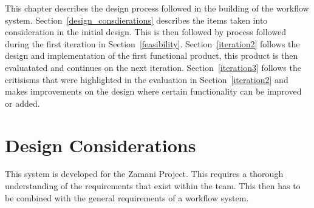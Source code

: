 \documentclass[12pt,a4paper]{report}
\begin{document}
\noindent This chapter describes the design process followed in the building
of the workflow system. Section~\ref{design_consdierations} describes
the items taken into consideration in the initial design. This is then
followed by process followed during the first iteration in Section~\ref{feasibility}.
Section~\ref{iteration2} follows the design and implementation of the
first functional product, this product is then evaluatated and continues
on the next iteration. Section~\ref{iteration3} follows the critisisms that
were highlighted in the evaluation in Section~\ref{iteration2} and makes
improvements on the design where certain functionality can be improved
or added.


\section{Design Considerations\label{design_consdierations}}
This system is developed for the Zamani Project. This requires
a thorough understanding of the requirements that exist within
the team. This then has to be combined with the general requirements
of a workflow system.
\end{document}
